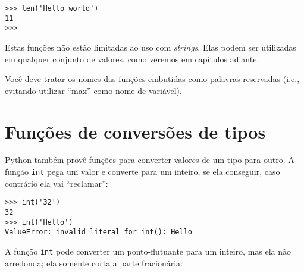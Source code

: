 \beforeverb
\begin{verbatim}
>>> len('Hello world')
11
>>>
\end{verbatim}
\afterverb
%
%
Estas funções não estão limitadas ao uso com {\it strings}. Elas podem ser
utilizadas em qualquer conjunto de valores, como veremos em capítulos adiante.


Você deve tratar os nomes das funções embutidas como palavras reservadas (i.e.,
evitando utilizar ``max'' como nome de variável).

\section{Funções de conversões de tipos}




Python também provê funções para converter valores de um tipo para outro. A
função {\tt int} pega um valor e converte para um inteiro, se ela conseguir,
caso contrário ela vai ``reclamar'':


\beforeverb
\begin{verbatim}
>>> int('32')
32
>>> int('Hello')
ValueError: invalid literal for int(): Hello
\end{verbatim}
\afterverb
%
%
A função {\tt int} pode converter um ponto-flutuante para um inteiro, mas ela
não arredonda; ela somente corta a parte fracionária:

